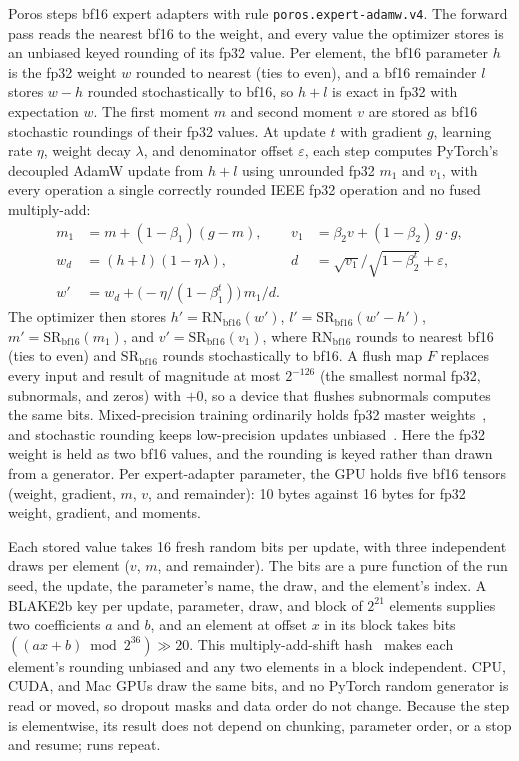 \documentclass[11pt,letterpaper]{article}
\theoremstyle{definition}
\theoremstyle{plain}
\newcommand{\code}[1]{\texttt{\small #1}}
\begin{document}
Poros steps bf16 expert adapters with rule \code{poros.expert-adamw.v4}.
The forward pass reads the nearest bf16 to the weight, and every value the optimizer stores is an unbiased keyed rounding of its fp32 value.
Per element, the bf16 parameter $h$ is the fp32 weight $w$ rounded to nearest (ties to even), and a bf16 remainder $l$ stores $w - h$ rounded stochastically to bf16, so $h + l$ is exact in fp32 with expectation $w$.
The first moment $m$ and second moment $v$ are stored as bf16 stochastic roundings of their fp32 values.
At update $t$ with gradient $g$, learning rate $\eta$, weight decay $\lambda$, and denominator offset $\varepsilon$, each step computes PyTorch's decoupled AdamW update from $h + l$ using unrounded fp32 $m_1$ and $v_1$, with every operation a single correctly rounded IEEE fp32 operation and no fused multiply-add:
\begin{align*}
m_1 &= m + (1 - \beta_1)(g - m), &
v_1 &= \beta_2 v + (1 - \beta_2)\, g \cdot g, \\
w_d &= (h + l)(1 - \eta \lambda), &
d &= \sqrt{v_1} / \sqrt{1 - \beta_2^t} + \varepsilon, \\
w' &= w_d + \bigl(-\eta / (1 - \beta_1^t)\bigr)\, m_1 / d.
\end{align*}
The optimizer then stores $h' = \mathrm{RN}_{\mathrm{bf16}}(w')$, $l' = \mathrm{SR}_{\mathrm{bf16}}(w' - h')$, $m' = \mathrm{SR}_{\mathrm{bf16}}(m_1)$, and $v' = \mathrm{SR}_{\mathrm{bf16}}(v_1)$, where $\mathrm{RN}_{\mathrm{bf16}}$ rounds to nearest bf16 (ties to even) and $\mathrm{SR}_{\mathrm{bf16}}$ rounds stochastically to bf16.
A flush map $F$ replaces every input and result of magnitude at most $2^{-126}$ (the smallest normal fp32, subnormals, and zeros) with $+0$, so a device that flushes subnormals computes the same bits.
Mixed-precision training ordinarily holds fp32 master weights~\cite{micikevicius2018mixed}, and stochastic rounding keeps low-precision updates unbiased~\cite{gupta2015deep,zamirai2020revisiting}.
Here the fp32 weight is held as two bf16 values, and the rounding is keyed rather than drawn from a generator.
Per expert-adapter parameter, the GPU holds five bf16 tensors (weight, gradient, $m$, $v$, and remainder): 10 bytes against 16 bytes for fp32 weight, gradient, and moments.

Each stored value takes 16 fresh random bits per update, with three independent draws per element ($v$, $m$, and remainder).
The bits are a pure function of the run seed, the update, the parameter's name, the draw, and the element's index.
A BLAKE2b key per update, parameter, draw, and block of $2^{21}$ elements supplies two coefficients $a$ and $b$, and an element at offset $x$ in its block takes bits $((a x + b) \bmod 2^{36}) \gg 20$.
This multiply-add-shift hash~\cite{dietzfelbinger1996universal} makes each element's rounding unbiased and any two elements in a block independent.
CPU, CUDA, and Mac GPUs draw the same bits, and no PyTorch random generator is read or moved, so dropout masks and data order do not change.
Because the step is elementwise, its result does not depend on chunking, parameter order, or a stop and resume; runs repeat.
\end{document}
